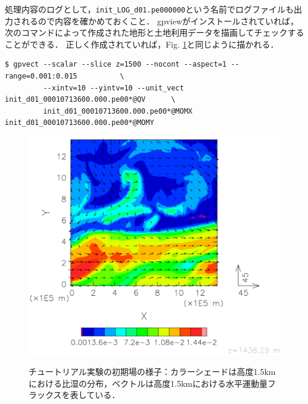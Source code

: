 処理内容のログとして，\verb|init_LOG_d01.pe000000|という名前でログファイルも出力されるので内容を確かめておくこと．
gpviewがインストールされていれば，次のコマンドによって作成された地形と土地利用データを描画してチェックすることができる．
正しく作成されていれば，Fig. \ref{fig:init}と同じように描かれる．

\begin{verbatim}
$ gpvect --scalar --slice z=1500 --nocont --aspect=1 --range=0.001:0.015          \
         --xintv=10 --yintv=10 --unit_vect init_d01_00010713600.000.pe00*@QV      \
         init_d01_00010713600.000.pe00*@MOMX init_d01_00010713600.000.pe00*@MOMY
\end{verbatim}


\begin{figure}[h]
\begin{center}
  \includegraphics[width=0.7\hsize]{./figure/init_qv-momxy.eps}\\
  \caption{チュートリアル実験の初期場の様子：カラーシェードは高度1.5kmにおける比湿の分布，ベクトルは高度1.5kmにおける水平運動量フラックスを表している．}
  \label{fig:init}
\end{center}
\end{figure}


